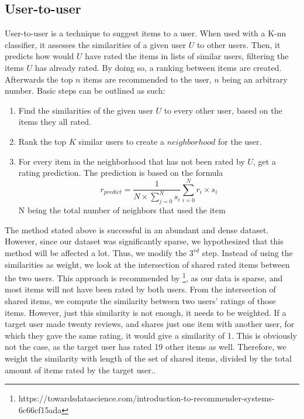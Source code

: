 \documentclass[11pt]{article}
\begin{document}
	\subsection{User-to-user}
	User-to-user is a technique to suggest items to a user. When used with a K-nn classifier, it assesses the similarities of a given user $U$ to other users. Then, it predicts how would $U$ have rated the items in lists of similar users, filtering the items $U$ has already rated. By doing so, a ranking between items are created. Afterwards the top $n$ items are recommended to the user, $n$ being an arbitrary number. Basic steps can be outlined as such:
	\begin{enumerate}
		\item Find the similarities of the given user $U$ to every other user, based on the items they all rated.
		\item Rank the top $K$ similar users to create a $neighborhood$ for the user.
		\item For every item in the neighborhood that has not been rated by $U$, get a rating prediction. The prediction is based on the formula $$r_{predict}=\frac{1}{N\times\sum_{j=0}^{N}s_i}\sum_{i=0}^{N}r_i\times s_i$$N being the total number of neighbors that used the item
	\end{enumerate}
	The method stated above is successful in an abundant and dense dataset. However, since our dataset was significantly sparse, we hypothesized that this method will be affected a lot. Thus, we modify the $3^{rd}$ step. Instead of using the similarities as weight, we look at the intersection of shared rated items between the two users. This approach is recommended by \footnote[1]{https://towardsdatascience.com/introduction-to-recommender-systems-6c66cf15ada}, as our data is sparse, and most items will not have been rated by both users. From the intersection of shared items, we compute the similarity between two users' ratings of those items. However, just this similarity is not enough, it needs to be weighted. If a target user made twenty reviews, and shares just one item with another user, for which they gave the same rating, it would give a similarity of 1. This is obviously not the case, as the target user has rated 19 other items as well. Therefore, we weight the similarity with length of the set of shared items, divided by the total amount of items rated by the target user.. 
	
\end{document}
